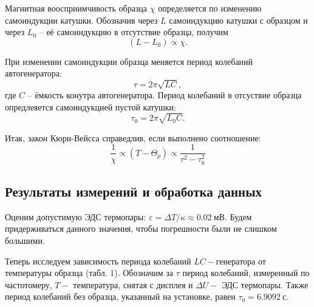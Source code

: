 \documentclass[12pt,a4paper]{article}
\begin{document}
Магнитная воосприимчивость образца $\chi$ определяется по изменению самоиндукции катушки. 
Обозначив через $L$ самоиндукцию катушки с образцом и через $L_0$ -- её самоиндукцию в отсутствие образца, получим
\[
    (L-L_0)\propto \chi.
\]

При изменении самоиндукции образца меняется период колебаний автогенератора:
\[    \tau = 2\pi \sqrt{LC}, \]
где $C$ -- ёмкость конутра автогенератора. Период колебаний в отсуствие образца опредлеяется самоиндукцией пустой катушки:
\[    \tau_0 = 2\pi \sqrt{L_0C}. \]

Итак, закон Кюри-Вейсса справедлив, если выполнено соотношение:
\begin{equation}
    \frac{1}{\chi} \propto (T-\Theta_p) \propto \frac{1}{\tau^2-\tau_0^2}
\end{equation}

\subsection*{Результаты измерений и обработка данных}
Оценим допустимую ЭДС термопары: $\varepsilon = \Delta T / \kappa  \approx 0.02\ мВ$. 
Будем придерживаться данного значения, чтобы погрешности были не слишком большими.

Теперь исследуем зависимость периода колебаний $LC-$генератора от температуры образца (табл. 1).
Обозначим за $\tau$ период колебаний, измеренный по частотомеру, $T -$ температура, снятая с дисплея и $\Delta U-$ ЭДС термопары.
Также период колебаний без образца, указанный на установке, равен $\tau_0 = 6.9092\ с$.
\end{document}
